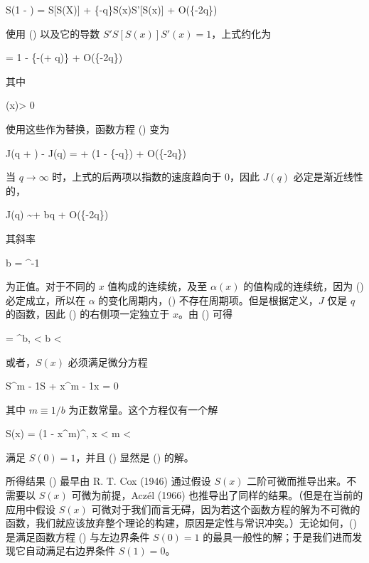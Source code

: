 \placeformula[2-50]
\startformula
S(1 - \delta) = S[S(X)] + \{-q\}S(x)S'[S(x)] + O(\{-2q\})
\stopformula

使用 (\in[2-46]) 以及它的导数 $S'S[S(x)]S'(x) = 1$，上式约化为

\placeformula[2-51]
\startformula
{} = 1 - \{-(\alpha + q)\} + O(\{-2q\})
\stopformula

其中

\placeformula[2-52]
\startformula
\alpha(x)\equiv\log{} > 0
\stopformula

使用这些作为替换，函数方程 (\in[2-45]) 变为

\placeformula[2-53]
\startformula
J(q + \alpha) - J(q) = \log{} + \log(1 - \{-q\}) + O(\{-2q\})
\stopformula

当 $q\rightarrow\infty$ 时，上式的后两项以指数的速度趋向于 0，因此 $J(q)$ 必定是渐近线性的，

\placeformula[2-54]
\startformula
J(q) \sim \alpha + bq + O(\{-2q\})
\stopformula

其斜率

\placeformula[2-55]
\startformula
b = \alpha^{-1}\log{}
\stopformula

为正值。对于不同的 $x$ 值构成的连续统，及至 $\alpha(x)$ 的值构成的连续统，因为 (\in[2-53]) 必定成立，所以在 $\alpha$ 的变化周期内，(\in[2-54]) 不存在周期项。但是根据定义，$J$ 仅是 $q$ 的函数，因此 (\in[2-55]) 的右侧项一定独立于 $x$。由 (\in[2-52]) 可得

\placeformula[2-56]
\startformula
{} = ^b,\quad{} < b < \infty
\stopformula

或者，$S(x)$ 必须满足微分方程

\placeformula[2-57]
\startformula
S^{m - 1}{}S + x^{m - 1}{}x = 0 
\stopformula

其中 $m\equiv 1/b$ 为正数常量。这个方程仅有一个解

\placeformula[2-58]
\startformula
S(x) = (1 - x^m)^{}, \quad\quad
\startmathmatrix[align=left]
 \le x  \NR
{} < m < \infty \NR
\stopmathmatrix
\stopformula

满足 $S(0) = 1$，并且 (\in[2-58]) 显然是 (\in[2-45]) 的解。

所得结果 (\in[2-58]) 最早由 R. T. Cox (1946) 通过假设 $S(x)$ 二阶可微而推导出来。不需要以 $S(x)$ 可微为前提，Acz\'el (1966) 也推导出了同样的结果。（但是在当前的应用中假设 $S(x)$ 可微对于我们而言无碍，因为若这个函数方程的解为不可微的函数，我们就应该放弃整个理论的构建，原因是定性与常识冲突。）无论如何，(\in[2-58]) 是满足函数方程 (\in[2-45]) 与左边界条件 $S(0) = 1$ 的最具一般性的解；于是我们进而发现它自动满足右边界条件 $S(1) = 0$。


